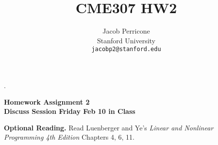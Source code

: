 \documentclass{article} %
\title{CME307 HW2}
\author{
Jacob Perricone\\
Stanford University\\
\texttt{jacobp2@stanford.edu} \\
}
\begin{document}
    \newcommand{\argmin}{\operatornamewithlimits{argmin}}.
    \maketitle
    
    
    
 \begin{center}
{\large \bf Homework Assignment 2 \\  Discuss Session Friday Feb 10 in Class}
\end{center}



\bigskip

{\textbf{Optional Reading.}} Read Luenberger and Ye's {\sl Linear
and Nonlinear Programming 4th Edition} Chapters 4, 6, 11.
\end{document}
